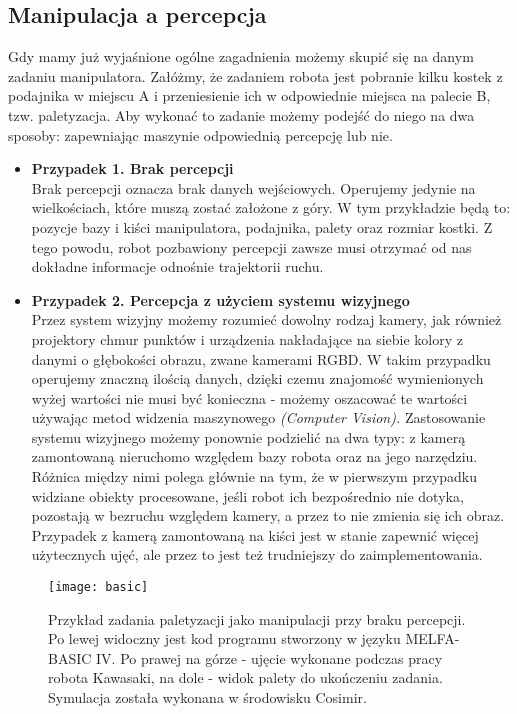 \documentclass{article}
\begin{document}
\subsection*{\LARGE{Manipulacja a percepcja}} 

Gdy mamy już wyjaśnione ogólne zagadnienia możemy skupić się na danym zadaniu manipulatora. Załóżmy, że zadaniem robota jest pobranie kilku kostek z podajnika w miejscu A i przeniesienie ich w odpowiednie miejsca na palecie B, tzw. paletyzacja. Aby wykonać to zadanie możemy podejść do niego na dwa sposoby: zapewniając maszynie odpowiednią percepcję lub nie. 

\begin{itemize}
\item \textbf{Przypadek 1. Brak percepcji} \\
Brak percepcji oznacza brak danych wejściowych. Operujemy jedynie na wielkościach, które muszą zostać założone z góry. W tym przykładzie będą to: pozycje bazy i kiści manipulatora, podajnika, palety oraz rozmiar kostki. Z tego powodu, robot pozbawiony percepcji zawsze musi otrzymać od nas dokładne informacje odnośnie trajektorii ruchu.

\item \textbf{Przypadek 2. Percepcja z użyciem systemu wizyjnego} \\
Przez system wizyjny możemy rozumieć dowolny rodzaj kamery, jak również projektory chmur punktów i urządzenia nakładające na siebie kolory z danymi o głębokości obrazu, zwane kamerami RGBD. W takim przypadku operujemy znaczną ilością danych, dzięki czemu znajomość wymienionych wyżej wartości nie musi być konieczna - możemy oszacować te wartości używając metod widzenia maszynowego \emph{(Computer Vision).} Zastosowanie systemu wizyjnego możemy ponownie podzielić na dwa typy: z kamerą zamontowaną nieruchomo względem bazy robota oraz na jego narzędziu. Różnica między nimi polega głównie na tym, że w pierwszym przypadku widziane obiekty procesowane, jeśli robot ich bezpośrednio nie dotyka, pozostają w bezruchu względem kamery, a przez to nie zmienia się ich obraz. Przypadek z kamerą zamontowaną na kiści jest w stanie zapewnić więcej użytecznych ujęć, ale przez to jest też trudniejszy do zaimplementowania.
\end{itemize}

\begin{figure}[h]
\texttt{[image: basic]}
\caption{Przykład zadania paletyzacji jako manipulacji przy braku percepcji. Po lewej widoczny jest kod programu stworzony w języku MELFA-BASIC IV. Po prawej na górze - ujęcie wykonane podczas pracy robota Kawasaki, na dole - widok palety do ukończeniu zadania. Symulacja została wykonana w środowisku Cosimir.}
\end{figure}
\end{document}
